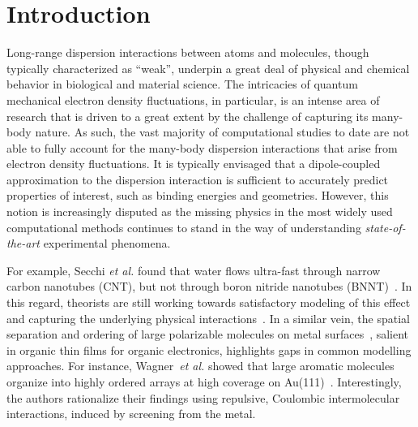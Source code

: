 \documentclass[aps,prl,groupaddress, twocolumn]{revtex4-1}  %
\begin{document}
\section*{Introduction}
Long-range dispersion interactions between atoms and molecules, though typically characterized as ``weak'', underpin a great deal of physical and chemical behavior in biological and material science. The intricacies of quantum mechanical electron density fluctuations, in particular, is an intense area of research that is driven to a great extent by the challenge of capturing its many-body nature. As such, the vast majority of computational studies to date are not able to fully account for the many-body dispersion interactions that arise from electron density fluctuations. It is typically envisaged that a dipole-coupled approximation to the dispersion interaction is sufficient to accurately predict properties of interest, such as binding energies and geometries. However, this notion is increasingly disputed as the missing physics in the most widely used computational methods continues to stand in the way of understanding \textit{state-of-the-art} experimental phenomena.

For example, Secchi \textit{et al.} found that water flows ultra-fast through narrow carbon nanotubes (CNT), but not through boron nitride nanotubes (BNNT)~\cite{secchi2016massive}. In this regard, theorists are still working towards satisfactory modeling of this effect and capturing the underlying physical interactions~\cite{Michaelides2016,Kannam2013,Striolo2016,Mattia2015266}. In a similar vein, the spatial separation and ordering of large polarizable molecules on metal surfaces~\cite{Wagner2010,Thussing2016}, salient in organic thin films for organic electronics, highlights gaps in common modelling approaches. For instance, Wagner~\textit{et al.} showed that large aromatic molecules organize into highly ordered arrays at high coverage on Au(111)~\cite{Wagner2010}. Interestingly, the authors rationalize their findings using repulsive, Coulombic intermolecular interactions, induced by screening from the metal.  %

\end{document}

